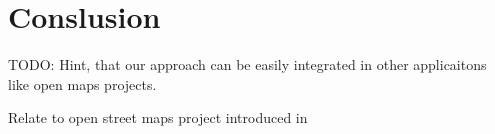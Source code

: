\chapter{Conslusion}\label{chapter:conclusion}

TODO: Hint, that our approach can be easily integrated in other applicaitons like open maps projects.

Relate to open street maps project introduced in \parencite{krumm}